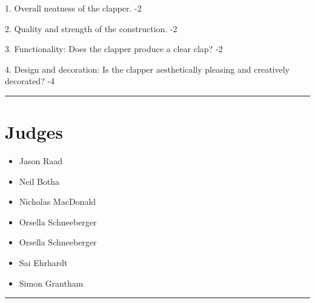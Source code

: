 \documentclass[10pt]{article}
\begin{document}
1. Overall neatness of the clapper. -2

2. Quality and strength of the construction. -2

3. Functionality: Does the clapper produce a clear clap? -2

4. Design and decoration: Is the clapper aesthetically pleasing and creatively decorated? -4
\vspace{0.5cm}
	\hrule
	\vspace{0.5cm}
		\section*{\faUsers \: Judges}

		

	\begin{multicols}{2}

		\begin{itemize}
									\item Jason Raad
									\item Neil Botha
									\item Nicholas MacDonald
									\item Orsella Schneeberger
						\end{itemize}

		\vfill\null
		\columnbreak

		\begin{itemize}
									\item Orsella Schneeberger
									\item Sai Ehrhardt
									\item Simon Grantham
						\end{itemize}

		\vfill\null

		\end{multicols}



			\vspace{0.5cm}
	\hrule
	\vspace{0.5cm}
\end{document}
